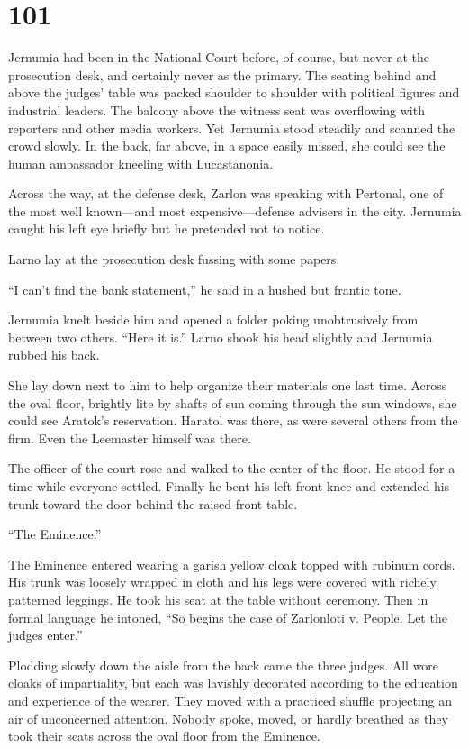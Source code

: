 
\chapter{101}

Jernumia had been in the National Court before, of course, but never at the prosecution desk,
and certainly never as the primary. The seating behind and above the judges' table was packed
shoulder to shoulder with political figures and industrial leaders. The balcony above the
witness seat was overflowing with reporters and other media workers. Yet Jernumia stood steadily
and scanned the crowd slowly. In the back, far above, in a space easily missed, she could see
the human ambassador kneeling with Lucastanonia.

Across the way, at the defense desk, Zarlon was speaking with Pertonal, one of the most well
known---and most expensive---defense advisers in the city. Jernumia caught his left eye briefly
but he pretended not to notice.

Larno lay at the prosecution desk fussing with some papers.

``I can't find the bank statement,'' he said in a hushed but frantic tone.

Jernumia knelt beside him and opened a folder poking unobtrusively from between two others.
``Here it is.'' Larno shook his head slightly and Jernumia rubbed his back.

She lay down next to him to help organize their materials one last time. Across the oval floor,
brightly lite by shafts of sun coming through the sun windows, she could see Aratok's
reservation. Haratol was there, as were several others from the firm. Even the Leemaster himself
was there.

The officer of the court rose and walked to the center of the floor. He stood for a time while
everyone settled. Finally he bent his left front knee and extended his trunk toward the door
behind the raised front table.

``The Eminence.''

The Eminence entered wearing a garish yellow cloak topped with rubinum cords. His trunk was
loosely wrapped in cloth and his legs were covered with richely patterned leggings. He took his
seat at the table without ceremony. Then in formal language he intoned, ``So begins the case of
Zarlonloti v. People. Let the judges enter.''

Plodding slowly down the aisle from the back came the three judges. All wore cloaks of
impartiality, but each was lavishly decorated according to the education and experience of the
wearer. They moved with a practiced shuffle projecting an air of unconcerned attention. Nobody
spoke, moved, or hardly breathed as they took their seats across the oval floor from the
Eminence.

